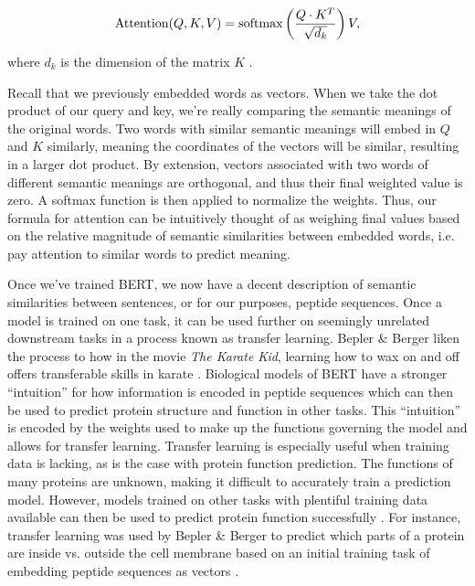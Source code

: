 \documentclass{SBCbookchapter}
\begin{document}
\begin{equation*}
    \textnormal{Attention}(Q, K, V) = \textnormal{softmax}\left(\frac{Q \cdot K^T}{\sqrt{d_k}}\right) V,
\end{equation*}

\noindent where $d_k$ is the dimension of the matrix $K$ \cite{vaswani_attention_2017}. 

Recall that we previously embedded words as vectors. When we take the dot product of our query and key, we're really comparing the semantic meanings of the original words. Two words with similar 
semantic meanings will embed in $Q$ and $K$ similarly, meaning the coordinates of the vectors will be similar, resulting in a larger dot product. By extension, vectors associated with two words of 
different semantic meanings are orthogonal, and thus their final weighted value is zero. A softmax function is then applied to normalize the weights. Thus, our formula for attention can be intuitively 
thought of as weighing final values based on the relative magnitude of semantic similarities between embedded words, i.e. pay attention to similar words to predict meaning. 

Once we've trained BERT, we now have a decent description of semantic similarities between sentences, or for our purposes, peptide sequences. Once a model is trained on one task, it can be used further 
on seemingly unrelated downstream tasks in a process known as transfer learning. Bepler \& Berger liken the process to how in the movie \textit{The Karate Kid}, learning how to wax on and off offers 
transferable skills in karate \cite{avildsen_karate_1984}. Biological models of BERT have a stronger ``intuition'' for how information is encoded in peptide sequences which can then be used to predict 
protein structure and function in other tasks. This ``intuition'' is encoded by the weights used to make up the functions governing the model and allows for transfer learning. Transfer learning is 
especially useful when training data is lacking, as is the case with protein function prediction. The functions of many proteins are unknown, making it difficult to accurately train a prediction model. 
However, models trained on other tasks with plentiful training data available can then be used to predict protein function successfully \cite{bepler_learning_2021}. For instance, transfer learning was 
used by Bepler \& Berger to predict which parts of a protein are inside vs. outside the cell membrane based on an initial training task of embedding peptide sequences as vectors 
\cite{bepler_learning_2019}. 
\end{document}
